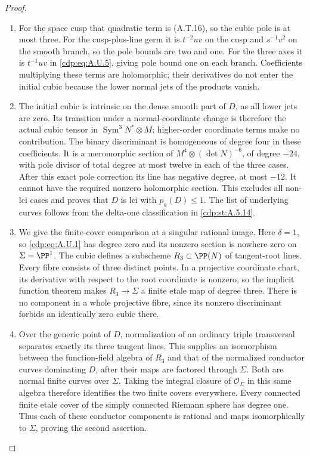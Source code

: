 \begin{proof}
\begin{enumerate}[label={$\langle1\rangle$\arabic*.},leftmargin=*]
\item For the space cusp that quadratic term is (A.T.16),
so the cubic pole is at most three. For the
cusp-plus-line germ it is $t^{-2}uv$ on the cusp
and $s^{-1}v^2$ on the smooth branch, so the pole
bounds are two and one. For the three axes it is
$t^{-1}uv$ in \eqref{cdp:eq:A.U.5}, giving pole bound one on
each branch. Coefficients multiplying these terms
are holomorphic; their derivatives do not enter
the initial cubic because the lower normal jets
of the products vanish.

\item The initial cubic is intrinsic on the dense smooth
part of $D$, as all lower jets are zero. Its
transition under a normal-coordinate change is
therefore the actual cubic tensor in
$\operatorname{Sym}^3N^*\otimes M$; higher-order
coordinate terms make no contribution. The binary
discriminant is homogeneous of degree four in
these coefficients. It is a meromorphic section
of $M^4\otimes(\det N)^{-6}$, of degree $-24$,
with pole divisor of total degree at most twelve
in each of the three cases. After this exact pole
correction its line has negative degree, at most
$-12$. It cannot have the required nonzero
holomorphic section. This excludes all non-lci
cases and proves that $D$ is lci with $p_a(D)\le1$.
The list of underlying curves follows from the
delta-one classification in \ref{cdp:st:A.5.14}.

\item We give the finite-cover comparison at a singular
rational image. Here $\delta=1$, so \eqref{cdp:eq:A.U.1} has
degree zero and its nonzero section is nowhere zero
on $\Sigma=\PP^1$. The cubic defines a subscheme
$R_3\subset\PP(N)$ of tangent-root lines. Every
fibre consists of three distinct points. In a
projective coordinate chart, its derivative with
respect to the root coordinate is nonzero, so the
implicit function theorem makes
$R_3\to\Sigma$ a finite etale map of degree three.
There is no component in a whole projective fibre,
since its nonzero discriminant forbids an identically
zero cubic there.

\item Over the generic point of $D$, normalization of an
ordinary triple transversal separates exactly its
three tangent lines. This supplies an isomorphism
between the function-field algebra of $R_3$ and
that of the normalized conductor curves dominating
$D$, after their maps are factored through $\Sigma$.
Both are normal finite curves over $\Sigma$.
Taking the integral closure of $\mathcal O_\Sigma$
in this same algebra therefore identifies the two
finite covers everywhere. Every connected finite
etale cover of the simply connected Riemann sphere
has degree one. Thus each of these conductor
components is rational and maps isomorphically to
$\Sigma$, proving the second assertion.


\end{enumerate}
\end{proof}
